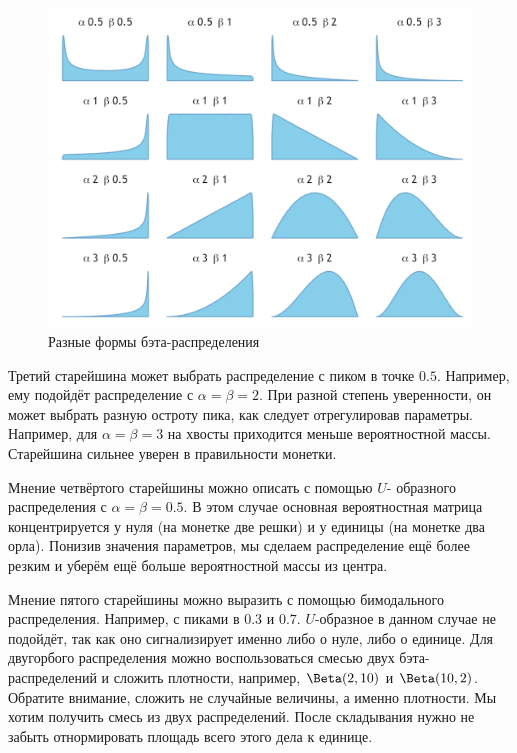 \documentclass[12pt, a4paper, oneside]{extreport}
\theoremstyle{plain}              %
\theoremstyle{definition}         %
\begin{document}
\begin{figure}[t]
\begin{center}
	\includegraphics[scale=0.6]{beta.png}
\end{center} 
\caption{Разные формы бэта-распределения}  \label{beta_dist} 
\end{figure} 

Третий старейшина может выбрать распределение с пиком в точке $0.5$.   Например, ему подойдёт распределение с $\alpha = \beta = 2$. При разной степень уверенности, он может выбрать разную остроту пика, как следует отрегулировав параметры. Например, для $\alpha = \beta = 3$ на хвосты приходится меньше вероятностной массы. Старейшина сильнее уверен в правильности монетки. 

Мнение четвёртого старейшины можно описать с помощью $U$- образного распределения с $\alpha = \beta = 0.5$. В этом случае основная вероятностная матрица концентрируется у нуля (на монетке две решки) и у единицы (на монетке два орла). Понизив значения параметров, мы сделаем распределение ещё более резким и уберём ещё больше вероятностной массы из центра.

Мнение пятого старейшины можно выразить с помощью бимодального распределения. Например, с пиками в $0.3$ и $0.7$. $U$-образное в данном случае не подойдёт, так как оно сигнализирует именно либо о нуле, либо о единице. Для двугорбого распределения можно воспользоваться смесью двух бэта-распределений и сложить плотности, например, $\Beta(2,10)$ и $\Beta(10,2)$. Обратите внимание, сложить не случайные величины, а именно плотности. Мы хотим получить смесь из двух распределений. После складывания нужно не забыть отнормировать площадь всего этого дела к единице. 
\end{document}

